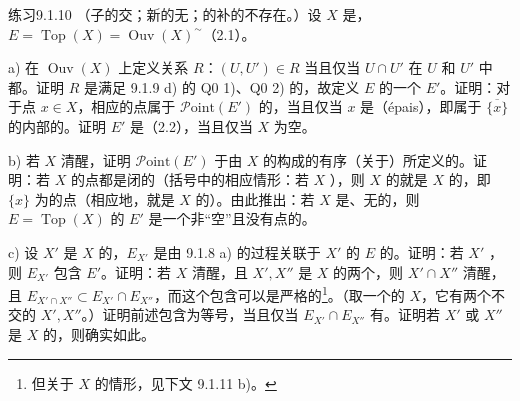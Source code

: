 \begin{SGAresult}{练习}{9.1.10}
（子的交；新的无；的补的不存在。）设 $X$ 是，$E=\operatorname{Top}(X)=\operatorname{Ouv}(X)^\sim$（2.1）。

a) 在 $\operatorname{Ouv}(X)$ 上定义关系 $R$：$(U,U')\in R$ 当且仅当 $U\cap U'$ 在 $U$ 和 $U'$ 中都。证明 $R$ 是满足 9.1.9 d) 的 Q0 1)、Q0 2) 的，故定义 $E$ 的一个 $E'$。证明：对于点 $x\in X$，相应的点属于 $\mathscr{P}\mathrm{oint}(E')$ 的，当且仅当 $x$ 是（épais），即属于 $\overline{\{x\}}$ 的内部的。证明 $E'$ 是（2.2），当且仅当 $X$ 为空。

b) 若 $X$ 清醒，证明 $\mathscr{P}\mathrm{oint}(E')$ 于由 $X$ 的构成的有序（关于）所定义的。证明：若 $X$ 的点都是闭的（括号中的相应情形：若 $X$ ），则 $X$ 的就是 $X$ 的，即 $\{x\}$ 为的点（相应地，就是 $X$ 的）。由此推出：若 $X$ 是、无的，则 $E=\operatorname{Top}(X)$ 的 $E'$ 是一个非“空”且没有点的。

c) 设 $X'$ 是 $X$ 的，$E_{X'}$ 是由 9.1.8 a) 的过程关联于 $X'$ 的 $E$ 的。证明：若 $X'$ ，则 $E_{X'}$ 包含 $E'$。证明：若 $X$ 清醒，且 $X',X''$ 是 $X$ 的两个，则 $X'\cap X''$ 清醒，且
$E_{X'\cap X''}\subset E_{X'}\cap E_{X''}$，而这个包含可以是严格的\footnote{但关于 $X$ 的情形，见下文 9.1.11 b)。}。（取一个的 $X$，它有两个不交的 $X',X''$。）证明前述包含为等号，当且仅当 $E_{X'}\cap E_{X''}$ 有。证明若 $X'$ 或 $X''$ 是 $X$ 的，则确实如此。


\end{SGAresult}
